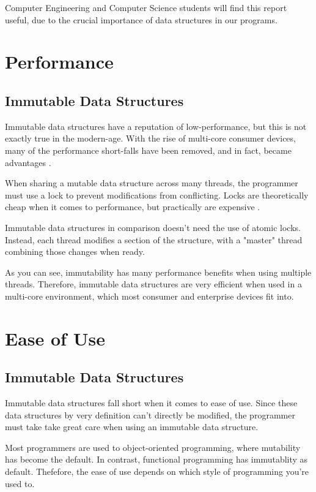 \documentclass[11pt]{article}
\begin{document}
Computer Engineering and Computer Science students will find this report useful,
due to the crucial importance of data structures in our programs.
\clearpage

\section{Performance}
\subsection{Immutable Data Structures}
Immutable data structures have a reputation of low-performance, but this is not
exactly true in the modern-age. With the rise of multi-core consumer devices,
many of the performance short-falls have been removed, and in fact, became
advantages \cite{slaks}.

When sharing a mutable data structure across many threads, the programmer must
use a lock to prevent modifications from conflicting. Locks are theoretically
cheap when it comes to performance, but practically are expensive
\cite{attractive_chaos}.

Immutable data structures in comparison doesn't need the use of atomic locks.
Instead, each thread modifies a section of the structure, with a "master"
thread combining those changes when ready.

As you can see, immutability has many performance benefits when using multiple
threads. Therefore, immutable data structures are very efficient when used in a
multi-core environment, which most consumer and enterprise devices fit into.

\section{Ease of Use}
\subsection{Immutable Data Structures}
Immutable data structures fall short when it comes to ease of use. Since these
data structures by very definition can't directly be modified, the programmer
must take take great care when using an immutable data structure.

Most programmers are used to object-oriented programming, where mutability has
become the default. In contrast, functional programming has immutablity as
default. Thefefore, the ease of use depends on which style of programming
you're used to.
\end{document}
